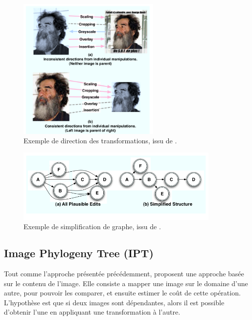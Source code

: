 \documentclass[utf8,final]{stageM2R} %
\begin{document}
\begin{figure}
  \begin{center}
    \includegraphics[width=70mm]{images/vmm_directionnel.png}
    \caption{Exemple de direction des transformations, issu de \autocite{kennedy2008internet}.}
    \label{vmm-directionnel}
  \end{center}
\end{figure}

\begin{figure}
  \begin{center}
    \includegraphics[width=100mm]{images/vmm_tree.png}
    \caption{Exemple de simplification de graphe, issu de \autocite{kennedy2008internet}.}
    \label{vmm-tree}
  \end{center}
\end{figure}

\subsection{Image Phylogeny Tree (IPT)}
\label{diasetal}

Tout comme l'approche présentée précédemment,  \autocite{dias2010first}\autocite{dias2012image} proposent une approche basée sur le contenu de l'image. Elle consiste a mapper une image sur le domaine d'une autre, pour pouvoir les comparer, et ensuite estimer le coût de cette opération. L'hypothèse est que si deux images sont dépendantes, alors il est possible d'obtenir l'une en appliquant une transformation à l'autre. 
\end{document}
